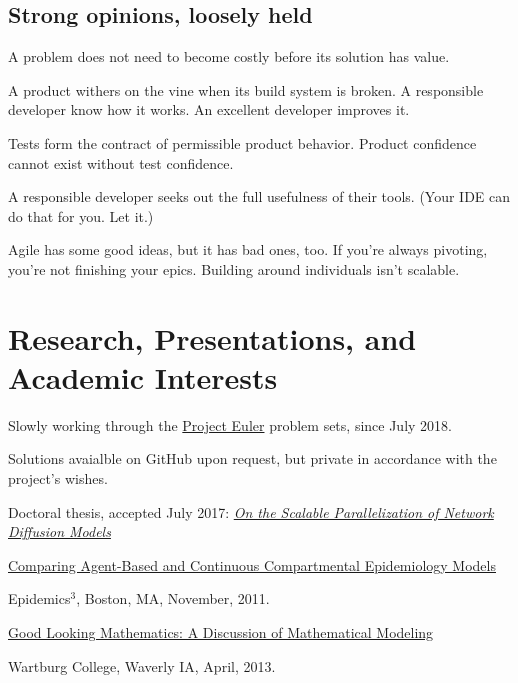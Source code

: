 \documentclass[10pt,letterpaper]{article}
\renewenvironment{itemize}{
  \begin{list}{}{
    \setlength{\leftmargin}{1.5em}
    \setlength{\itemsep}{0.25em}
    \setlength{\parskip}{0pt}
    \setlength{\parsep}{0.25em}
  }
}{
  \end{list}
}
\begin{document}
\subsection*{Strong opinions, loosely held}
\begin{itemize}
  \item A problem does not need to become costly before its solution has value.
  \item A product withers on the vine when its build system is broken.  A responsible developer know how it works.  An excellent developer improves it.
  \item Tests form the contract of permissible product behavior.  Product confidence cannot exist without test confidence.
  \item A responsible developer seeks out the full usefulness of their tools.  (Your IDE can do that for you.  Let it.)
  \item Agile has some good ideas, but it has bad ones, too.  If you're always pivoting, you're not finishing your epics.  Building around individuals isn't scalable.
\end{itemize}

\section*{Research, Presentations, and Academic Interests}
\begin{itemize}
\item Slowly working through the \href{https://projecteuler.net/}{Project Euler} problem sets, since July 2018.
\begin{itemize}
\item Solutions avaialble on GitHub upon request, but private in accordance with the project's wishes.
\end{itemize}
\item
  Doctoral thesis, accepted July 2017:
  \href{https://ir.uiowa.edu/etd/5831/}
    {\em On the Scalable Parallelization of Network Diffusion Models}
\item
  \href{http://www.math.uiowa.edu/~prhomber/Rhomberg-E3-ModelComparison.pdf}
    {Comparing Agent-Based and Continuous Compartmental Epidemiology Models}
  \begin{itemize}
  \item Epidemics$^3$,
    Boston, MA, November, 2011.
  \end{itemize}
\item
  \href{http://www.math.uiowa.edu/~prhomber/beamer.pdf}
    {Good Looking Mathematics: A Discussion of Mathematical Modeling}
  \begin{itemize}
  \item  Wartburg College, Waverly IA, April, 2013.
  \end{itemize}
\end{itemize}
\end{document}
